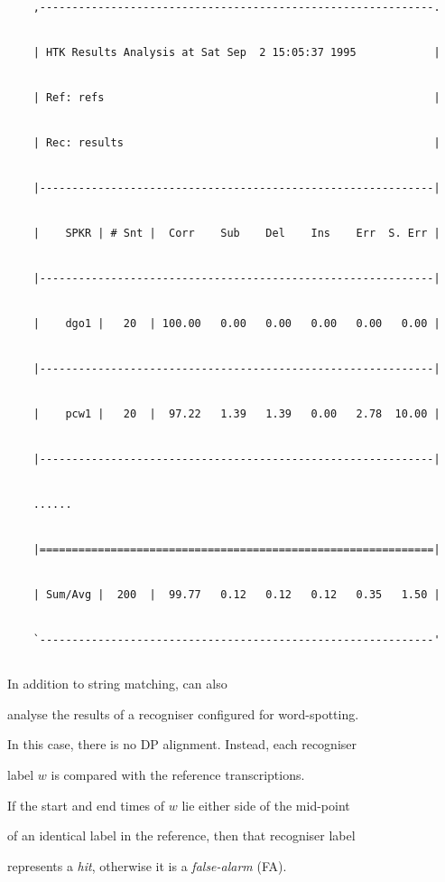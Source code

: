 \begin{verbatim}


    ,-------------------------------------------------------------.


    | HTK Results Analysis at Sat Sep  2 15:05:37 1995            |


    | Ref: refs                                                   |


    | Rec: results                                                |


    |-------------------------------------------------------------|


    |    SPKR | # Snt |  Corr    Sub    Del    Ins    Err  S. Err |


    |-------------------------------------------------------------|


    |    dgo1 |   20  | 100.00   0.00   0.00   0.00   0.00   0.00 |


    |-------------------------------------------------------------|


    |    pcw1 |   20  |  97.22   1.39   1.39   0.00   2.78  10.00 |


    |-------------------------------------------------------------|


    ......


    |=============================================================|


    | Sum/Avg |  200  |  99.77   0.12   0.12   0.12   0.35   1.50 |


    `-------------------------------------------------------------'


\end{verbatim}





In addition to string matching,  can also 


analyse the results of a recogniser configured for word-spotting.


In this case, there is no DP alignment.  Instead, each recogniser


label $w$ is compared with the reference transcriptions.


If the start and end times of $w$ lie either side of the mid-point


of an identical label in the reference, then that recogniser label


represents a \textit{hit}, otherwise it is a \textit{false-alarm} (FA).





